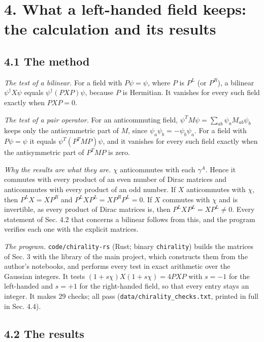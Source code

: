 \documentclass[
  10pt,
]{article}
\begin{document}
\hypertarget{what-a-left-handed-field-keeps-the-calculation-and-its-results}{%
\section{4. What a left-handed field keeps: the calculation and its
results}\label{what-a-left-handed-field-keeps-the-calculation-and-its-results}}

\hypertarget{the-method}{%
\subsection{4.1 The method}\label{the-method}}

\emph{The test of a bilinear.} For a field with \(P\psi=\psi\), where
\(P\) is \(P^L\) (or \(P^R\)), a bilinear \(\psi^\dagger X\psi\) equals
\(\psi^\dagger(PXP)\psi\), because \(P\) is Hermitian. It vanishes for
every such field exactly when \(PXP=0\).

\emph{The test of a pair operator.} For an anticommuting field,
\(\psi^TM\psi=\sum_{ab}\psi_aM_{ab}\psi_b\) keeps only the antisymmetric
part of \(M\), since \(\psi_a\psi_b=-\psi_b\psi_a\). For a field with
\(P\psi=\psi\) it equals \(\psi^T(P^TMP)\psi\), and it vanishes for
every such field exactly when the antisymmetric part of \(P^TMP\) is
zero.

\emph{Why the results are what they are.} \(\chi\) anticommutes with
each \(\gamma^A\). Hence it commutes with every product of an even
number of Dirac matrices and anticommutes with every product of an odd
number. If \(X\) anticommutes with \(\chi\), then \(P^LX=XP^R\) and
\(P^LXP^L=XP^RP^L=0\). If \(X\) commutes with \(\chi\) and is
invertible, as every product of Dirac matrices is, then
\(P^LXP^L=XP^L\neq0\). Every statement of Sec. 4.2 that concerns a
bilinear follows from this, and the program verifies each one with the
explicit matrices.

\emph{The program.} \texttt{code/chirality-rs} (Rust; binary
\texttt{chirality}) builds the matrices of Sec. 3 with the library of
the main project, which constructs them from the author's notebooks, and
performs every test in exact arithmetic over the Gaussian integers. It
tests \((1+s\chi)X(1+s\chi)=4PXP\) with \(s=-1\) for the left-handed and
\(s=+1\) for the right-handed field, so that every entry stays an
integer. It makes 29 checks; all pass
(\texttt{data/chirality\_checks.txt}, printed in full in Sec. 4.4).

\hypertarget{the-results}{%
\subsection{4.2 The results}\label{the-results}}
\end{document}
